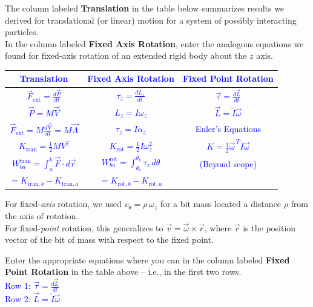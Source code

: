 \documentclass[11pt, letterpaper, openany]{book}
\newenvironment{exercise}[1][Exercise]{%
  \tcolorbox[blanker, breakable, left=1em,
    before skip=1em, after skip=1em,
    borderline west={3pt}{0pt}{PhysNavy},
    colback=PhysCream,
    before upper={\textcolor{PhysNavy}{\sffamily\bfseries #1:}\space}
  ]%
}{%
  \endtcolorbox%
}
\begin{document}
\begin{exercise}[Exercise 1]
The column labeled \textbf{Translation} in the table below summarizes results we derived for translational (or linear) motion for a system of possibly interacting particles. \\
In the column labeled \textbf{Fixed Axis Rotation}, enter the analogous equations we found for fixed-axis rotation of an extended rigid body about the $z$ axis. \\
\textcolor{blue}{
\begin{center}
\begin{tabular}{|c|c|c|}
\hline
\textbf{Translation} & \textbf{Fixed Axis Rotation} & \textbf{Fixed Point Rotation} \\
\hline
$\vec{F}_{\text{ext}} = \frac{d\vec{P}}{dt}$ & $\tau_z = \frac{dL_z}{dt}$ & $\vec{\tau} = \frac{d\vec{L}}{dt}$ \\
\hline
$\vec{P} = M\vec{V}$ & $L_z = I\omega_z$ & $\vec{L} = \tilde{I}\vec{\omega}$ \\
\hline
$\vec{F}_{\text{ext}} = M\frac{d\vec{V}}{dt} = M\vec{A}$ & $\tau_z = I\alpha_z$ & Euler's Equations \\
\hline
$K_{\text{tran}} = \frac{1}{2}MV^2$ & $K_{\text{rot}} = \frac{1}{2}I\omega_z^2$ & $K = \frac{1}{2}\vec{\omega}^{\,T}\tilde{I}\vec{\omega}$ \\
\hline
$W_{ba}^{\text{tran}} = \int_a^b \vec{F} \cdot d\vec{r}$ & $W_{ba}^{\text{rot}} = \int_{\theta_a}^{\theta_b} \tau_z\,d\theta$ & (Beyond scope) \\
$= K_{\text{tran},b} - K_{\text{tran},a}$ & $= K_{\text{rot},b} - K_{\text{rot},a}$ & \\
\hline
\end{tabular}
\end{center}
}
\end{exercise}

\begin{exercise}[Quick Exercise 2]
For fixed-\textit{axis} rotation, we used $v_\theta = \rho\,\omega_z$ for a bit mass located a distance $\rho$ from the axis of rotation. \\
For fixed-\textit{point} rotation, this generalizes to $\vec{v} = \vec{\omega} \times \vec{r}$, where $\vec{r}$ is the position vector of the bit of mass with respect to the fixed point.
\end{exercise}

\begin{exercise}[Exercise 3]
Enter the appropriate equations where you can in the column labeled \textbf{Fixed Point Rotation} in the table above -- i.e., in the first two rows. \\
\textcolor{blue}{
Row 1: $\vec{\tau} = \frac{d\vec{L}}{dt}$ \\
Row 2: $\vec{L} = \tilde{I}\vec{\omega}$
}
\end{exercise}
\end{document}
